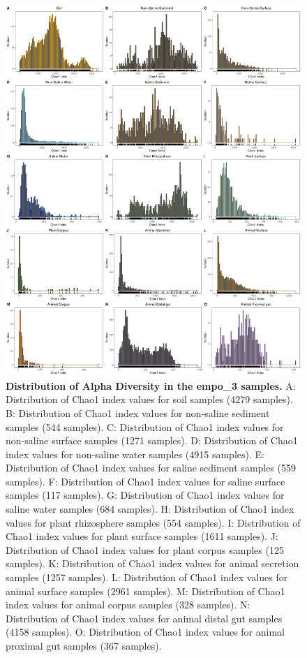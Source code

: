 \begin{figure}[H]
    \centering
    \includegraphics[scale=0.33]{./Figures/Chao_hist_empo3}
    \caption{\textbf{Distribution of Alpha Diversity in the empo\_3 samples.} A: Distribution of Chao1 index values for soil samples (4279 samples). B: Distribution of Chao1 index values for non-saline sediment samples (544 samples). C: Distribution of Chao1 index values for non-saline surface samples (1271 samples). D: Distribution of Chao1 index values for non-saline water samples (4915 samples). E: Distribution of Chao1 index values for saline sediment samples (559 samples). F: Distribution of Chao1 index values for saline surface samples (117 samples). G: Distribution of Chao1 index values for saline water samples (684 samples). H: Distribution of Chao1 index values for plant rhizosphere samples (554 samples). I: Distribution of Chao1 index values for plant surface samples (1611 samples). J: Distribution of Chao1 index values for plant corpus samples (125 samples). K: Distribution of Chao1 index values for animal secretion samples (1257 samples). L: Distribution of Chao1 index values for animal surface samples (2961 samples). M: Distribution of Chao1 index values for animal corpus samples (328 samples). N: Distribution of Chao1 index values for animal distal gut samples (4158 samples). O: Distribution of Chao1 index values for animal proximal gut samples (367 samples).}
    \label{fig:Chao_hist3}
\end{figure}

